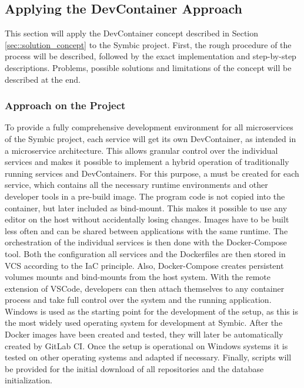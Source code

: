     \subsection{Applying the DevContainer Approach}\label{ssec::apply}
    This section will apply the DevContainer concept described in Section \ref{sec::solution_concept} to the Symbic project. First, the rough procedure of the process will be described, followed by the exact implementation and step-by-step descriptions. Problems, possible solutions and limitations of the concept will be described at the end.

        \subsubsection{Approach on the Project}\label{ssec::imp_approach}
        To provide a fully comprehensive development environment for all microservices of the Symbic project, each service will get its own DevContainer, as intended in a microservice architecture. This allows granular control over the individual services and makes it possible to implement a hybrid operation of traditionally running services and DevContainers. For this purpose, a  must be created for each service, which contains all the necessary runtime environments and other developer tools in a pre-build image. The program code is not copied into the container, but later included as bind-mount. This makes it possible to use any editor on the host without accidentally losing changes. Images have to be built less often and can be shared between applications with the same runtime. The orchestration of the individual services is then done with the Docker-Compose tool. Both the configuration all services and the Dockerfiles are then stored in \ac{VCS} according to the \ac{IaC} principle. Also, Docker-Compose creates persistent volumes mounts and bind-mounts from the host system. With the remote extension of \ac{VSCode}, developers can then attach themselves to any container process and take full control over the system and the running application.\newline
        Windows is used as the starting point for the development of the setup, as this is the most widely used operating system for development at Symbic. After the Docker images have been created and tested, they will later be automatically created by GitLab \ac{CI}. Once the setup is operational on Windows systems it is tested on other operating systems and adapted if necessary. Finally, scripts will be provided for the initial download of all repositories and the database initialization.

